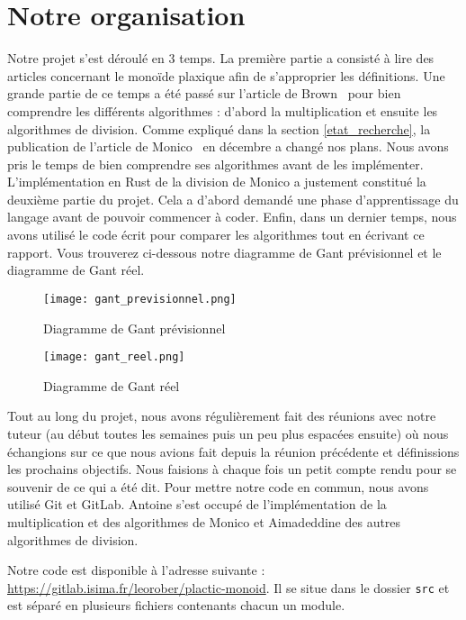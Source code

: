 \section{Notre organisation}
Notre projet s'est déroulé en 3 temps. La première partie a consisté à lire des articles concernant le monoïde plaxique afin de s'approprier les définitions. Une grande partie de ce temps a été passé sur l'article de Brown~\cite{brown2021plactic} pour bien comprendre les différents algorithmes : d'abord la multiplication et ensuite les algorithmes de division. Comme expliqué dans la section \ref{etat_recherche}, la publication de l'article de Monico~\cite{monico2022division} en décembre a changé nos plans. Nous avons pris le temps de bien comprendre ses algorithmes avant de les implémenter. L'implémentation en Rust de la division de Monico a justement constitué la deuxième partie du projet. Cela a d'abord demandé une phase d'apprentissage du langage avant de pouvoir commencer à coder. Enfin, dans un dernier temps, nous avons utilisé le code écrit pour comparer les algorithmes tout en écrivant ce rapport. Vous trouverez ci-dessous notre diagramme de Gant prévisionnel et le diagramme de Gant réel.
\begin{figure}[!h]
	\centering
	\texttt{[image: gant\_previsionnel.png]}
	\caption{Diagramme de Gant prévisionnel}
\end{figure}
\begin{figure}[!h]
	\centering
	\texttt{[image: gant\_reel.png]}
	\caption{Diagramme de Gant réel}
\end{figure}

\pagebreak
Tout au long du projet, nous avons régulièrement fait des réunions avec notre tuteur (au début toutes les semaines puis un peu plus espacées ensuite) où nous échangions sur ce que nous avions fait depuis la réunion précédente et définissions les prochains objectifs. Nous faisions à chaque fois un petit compte rendu pour se souvenir de ce qui a été dit. Pour mettre notre code en commun, nous avons utilisé Git et GitLab. Antoine s'est occupé de l'implémentation de la multiplication et des algorithmes de Monico et Aimadeddine des autres algorithmes de division.

Notre code est disponible à l'adresse suivante : \href{https://gitlab.isima.fr/leorober/plactic-monoid}{https://gitlab.isima.fr/leorober/plactic-monoid}. Il se situe dans le dossier \texttt{src} et est séparé en plusieurs fichiers contenants chacun un module. 

